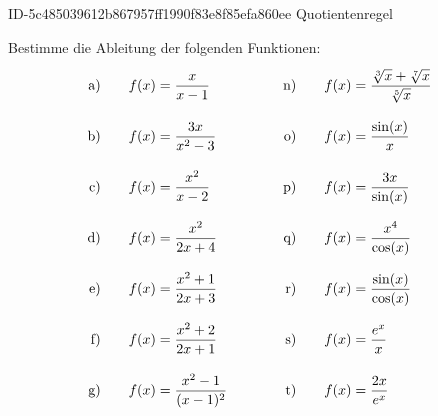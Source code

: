 \begin{exercise}
      {ID-5c485039612b867957ff1990f83e8f85efa860ee}
      {Quotientenregel}
  \ifproblem\problem\par
    Bestimme die Ableitung der folgenden Funktionen:
    \begingroup
      \newcommand{\vstrut}{\rule[-3.5ex]{0pt}{7.5ex}}%
      \newcommand{\xca}{f(x)&=\frac{x}{x-1}}%
      \newcommand{\xcb}{f(x)&=\frac{3x}{x^{2}-3}}%
      \newcommand{\xcc}{f(x)&=\frac{x^{2}}{x-2}}%
      \newcommand{\xcd}{f(x)&=\frac{x^{2}}{2x+4}}%
      \newcommand{\xce}{f(x)&=\frac{x^{2}+1}{2x+3}}%
      \newcommand{\xcf}{f(x)&=\frac{x^{2}+2}{2x+1}}%
      \newcommand{\xcg}{f(x)&=\frac{x^{2}-1}{(x-1)^{2}}}%
      \newcommand{\xch}{f(x)&=\frac{2x+1}{2x-1}}%
      \newcommand{\xci}{f(x)&=\frac{x-t}{x^{2}+t}}%
      \newcommand{\xcj}{f(x)&=\frac{x^{2}+2x-1}{x-1}}%
      \newcommand{\xck}{f(x)&=\frac{x^{2}}{-x^{3}+6x-4}}%
      \newcommand{\xcl}{f(x)&=\frac{5x-3}{3x^{2}}}%
      \newcommand{\xcm}{f(x)&=\frac{4a}{x}}%
      \newcommand{\xcn}{f(x)&=\frac{\sqrt[3]{x}+\sqrt[7]{x}}{\sqrt[5]{x}}}%
      \newcommand{\xco}{f(x)&=\frac{\sin(x)}{x}}%
      \newcommand{\xcp}{f(x)&=\frac{3x}{\sin(x)}}%
      \newcommand{\xcq}{f(x)&=\frac{x^{4}}{\cos(x)}}%
      \newcommand{\xcr}{f(x)&=\frac{\sin(x)}{\cos(x)}}%
      \newcommand{\xcs}{f(x)&=\frac{e^{x}}{x}}%
      \newcommand{\xct}{f(x)&=\frac{2x}{e^{x}}}%
      \newcommand{\xcu}{f(x)&=\frac{e^{x}-x}{\sqrt{x}}}%
      \newcommand{\xcv}{f(x)&=\frac{x^{2}+1}{e^{x}}}%
      \newcommand{\xcw}{f(x)&=\frac{x}{\ln(x)}}%
      \newcommand{\xcx}{f(x)&=\frac{3\log_{3}(x)}{x^{3}}}%
      \newcommand{\xcy}{f(x)&=\frac{x^{2}-\ln(x)}{\ln(x)-x^{2}}}%
      \newcommand{\xcz}{f(x)&=\log_{x^{n}}(a)}%
      \allowdisplaybreaks
      \begin{alignat*}{5}
        \text{a)\vstrut}&\quad & \xca & \quad&\quad & \text{n)\vstrut}&\quad & \xcn \\
        \text{b)\vstrut}&\quad & \xcb & \quad&\quad & \text{o)\vstrut}&\quad & \xco \\
        \text{c)\vstrut}&\quad & \xcc & \quad&\quad & \text{p)\vstrut}&\quad & \xcp \\
        \text{d)\vstrut}&\quad & \xcd & \quad&\quad & \text{q)\vstrut}&\quad & \xcq \\
        \text{e)\vstrut}&\quad & \xce & \quad&\quad & \text{r)\vstrut}&\quad & \xcr \\
        \text{f)\vstrut}&\quad & \xcf & \quad&\quad & \text{s)\vstrut}&\quad & \xcs \\
        \text{g)\vstrut}&\quad & \xcg & \quad&\quad & \text{t)\vstrut}&\quad & \xct \\

\end{alignat*}
\end{exercise}
